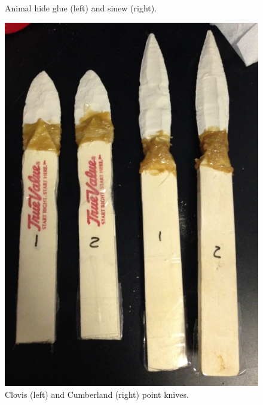 \begin{figure}[!p]
\begin{minipage}{0.4\textwidth}
		\caption{Animal hide glue (left) and sinew (right).}
		\label{fig:gagglioli_Fig3}
	\end{minipage}
\end{figure}

\begin{figure}[!p]
	\includegraphics[width=\linewidth]{figures/gagglioli_Fig4}
	\centering
	\caption{Clovis (left) and Cumberland (right) point knives.}
	\label{fig:gagglioli_Fig4}
\end{figure}

